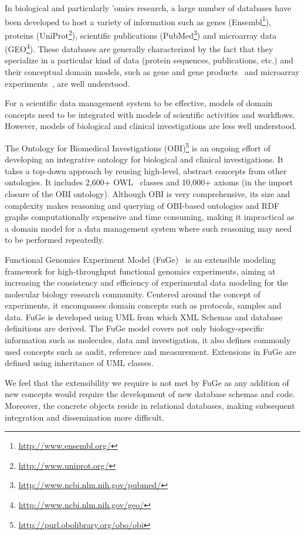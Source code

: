 \documentclass{elsarticle}
\begin{document}
In biological and particularly 'omics research,
a large number of databases have been
developed to host a variety of information such as genes
(Ensembl\footnote{\url{http://www.ensembl.org/}}), proteins
(UniProt\footnote{\url{http://www.uniprot.org/}}), scientific
publications (PubMed\footnote{\url{http://www.ncbi.nlm.nih.gov/pubmed/}}) and
microarray data (GEO\footnote{\url{http://www.ncbi.nlm.nih.gov/geo/}}).
These databases are generally characterized by the fact that they
specialize in a particular kind of data (protein sequences,
publications, etc.) and their conceptual domain models,
such as gene and gene products~\cite{citeulike:212874}
and microarray experiments~\cite{citeulike:151946},
are well understood.

For a scientific data management system to be effective, models of
domain concepts need to be integrated with models of scientific
activities and workflows. However, models of biological and clinical
investigations are less well understood.

The Ontology for Biomedical Investigations
(OBI)\footnote{\url{http://purl.obolibrary.org/obo/obi}} is an
ongoing effort of developing an integrative ontology for biological
and clinical investigations. It takes a top-down approach by reusing
high-level, abstract concepts from other ontologies. It includes
2,600+ OWL~\cite{hoph03a} classes and 10,000+ axioms (in the import
closure of the OBI ontology). Although OBI is very comprehensive,
its size and complexity makes reasoning and querying of OBI-based
ontologies and RDF graphs computationally expensive and time
consuming, making it impractical as a domain model for a data
management system where such reasoning may need to be performed
repeatedly.

Functional Genomics Experiment Model (FuGe)~\cite{citeulike:1756058}
is an extensible modeling framework for high-throughput functional
genomics experiments, aiming at increasing the consistency and
efficiency of experimental data modeling for the molecular biology
research community. Centered around the concept of experiments, it
encompasses domain concepts such as protocols, samples and data.
FuGe is developed using UML from which XML Schemas and database
definitions are derived. The FuGe model covers not only
biology-specific information such as molecules, data and
investigation, it also defines commonly used concepts such as audit,
reference and measurement. Extensions in FuGe are defined using
inheritance of UML classes.

We feel that the extensibility we require is not met by FuGe as any
addition of new concepts would require the development of new
database schemas and code. Moreover, the concrete objects reside in
relational databases, making subsequent integration and
dissemination more difficult.
\end{document}
